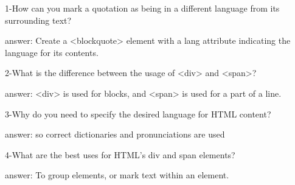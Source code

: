 1-How can you mark a quotation as being in a different language from its surrounding text?

answer: Create a <blockquote> element with a lang attribute indicating the language for its contents.

2-What is the difference between the usage of <div> and <span>?

answer: <div> is used for blocks, and <span> is used for a part of a line.

3-Why do you need to specify the desired language for HTML content?

answer: so correct dictionaries and pronunciations are used

4-What are the best uses for HTML's div and span elements?

answer: To group elements, or mark text within an element.

